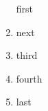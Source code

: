\documentclass{article}
\newcommand{\clitem}{\fitem{\icircled}}
\begin{document}
\begin{enumerate}
  \clitem first
  \item next
  \item third
  \item fourth
  \item last
\end{enumerate}
\end{document}
